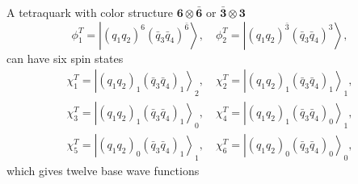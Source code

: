 \documentclass[prd,twocolumn,floatfix,nofootinbib]{revtex4}
\begin{document}
A tetraquark with color structure $\boldsymbol{6}\otimes\boldsymbol{\bar{6}}$ or $\boldsymbol{\bar{3}}\otimes\boldsymbol{3}$ 
\begin{equation}\label{colorT}
    \phi_{1}^{T}=\left| {\left(q_{1}q_{2}\right)}^{6} {\left(\bar{q}_{3}\bar{q}_{4}\right)}^{\bar{6}} \right\rangle, \quad
    \phi_{2}^{T}=\left| {\left(q_{1}q_{2}\right)}^{\bar{3}} {\left(\bar{q}_{3}\bar{q}_{4}\right)}^{3} \right\rangle,
\end{equation}
can have six spin states
\begin{equation}\label{spinT}
    \begin{aligned}
        \chi_{1}^{T}={\left| {\left(q_{1}q_{2}\right)}_{1} {\left(\bar{q}_{3}\bar{q}_{4}\right)}_{1} \right\rangle}_{2}, \quad
        \chi_{2}^{T}={\left| {\left(q_{1}q_{2}\right)}_{1} {\left(\bar{q}_{3}\bar{q}_{4}\right)}_{1} \right\rangle}_{1}, \\
        \chi_{3}^{T}={\left| {\left(q_{1}q_{2}\right)}_{1} {\left(\bar{q}_{3}\bar{q}_{4}\right)}_{1} \right\rangle}_{0}, \quad
        \chi_{4}^{T}={\left| {\left(q_{1}q_{2}\right)}_{1} {\left(\bar{q}_{3}\bar{q}_{4}\right)}_{0} \right\rangle}_{1}, \\
        \chi_{5}^{T}={\left| {\left(q_{1}q_{2}\right)}_{0} {\left(\bar{q}_{3}\bar{q}_{4}\right)}_{1} \right\rangle}_{1}, \quad
        \chi_{6}^{T}={\left| {\left(q_{1}q_{2}\right)}_{0} {\left(\bar{q}_{3}\bar{q}_{4}\right)}_{0} \right\rangle}_{0},
    \end{aligned}
\end{equation}
which gives twelve base wave functions
\end{document}
